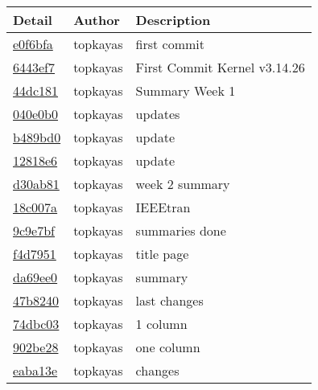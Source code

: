 \begin{tabular}{l l l}\textbf{Detail} & \textbf{Author} & \textbf{Description}\\\hline
\href{git@github.com:topkayas/CS444/commit/e0f6bfaafb812f0756fcb6deb6758c3fe1bf53b0}{e0f6bfa} & topkayas & first commit\\\hline
\href{git@github.com:topkayas/CS444/commit/6443ef797e6589433f3e981c7adaa47f24fd53ba}{6443ef7} & topkayas & First Commit Kernel v3.14.26\\\hline
\href{git@github.com:topkayas/CS444/commit/44dc181c2681efe404325a17c74427d494993060}{44dc181} & topkayas & Summary Week 1\\\hline
\href{git@github.com:topkayas/CS444/commit/040e0b0809d4b0b58787aafb1f8cf2cd4fe2962b}{040e0b0} & topkayas & updates\\\hline
\href{git@github.com:topkayas/CS444/commit/b489bd05b7672cd26e9542f995aac2a7e6d11635}{b489bd0} & topkayas & update\\\hline
\href{git@github.com:topkayas/CS444/commit/12818e6c4169cd06beaf130670f79b7111f5de41}{12818e6} & topkayas & update\\\hline
\href{git@github.com:topkayas/CS444/commit/d30ab815100d1cdb8c11f731b60f8d8bc801a310}{d30ab81} & topkayas & week 2 summary\\\hline
\href{git@github.com:topkayas/CS444/commit/18c007a6079a2a1c950f3b8abd160d71373ecc84}{18c007a} & topkayas & IEEEtran\\\hline
\href{git@github.com:topkayas/CS444/commit/9c9e7bf414a403688cf51d2e12bfb4cd81a9865c}{9c9e7bf} & topkayas & summaries done\\\hline
\href{git@github.com:topkayas/CS444/commit/f4d795117875c265bab1dbd47ea4acda59f437f1}{f4d7951} & topkayas & title page\\\hline
\href{git@github.com:topkayas/CS444/commit/da69ee05be6968f69c8222b99384447b3d0ecc21}{da69ee0} & topkayas & summary\\\hline
\href{git@github.com:topkayas/CS444/commit/47b8240462ba004452a13729ffadf92ccaa6f105}{47b8240} & topkayas & last changes\\\hline
\href{git@github.com:topkayas/CS444/commit/74dbc03c78cb2e617df6e9048f06bd10cb2c8e9b}{74dbc03} & topkayas & 1 column\\\hline
\href{git@github.com:topkayas/CS444/commit/902be284317fd5be08fec57a7fd557e6b3356dde}{902be28} & topkayas & one column\\\hline
\href{git@github.com:topkayas/CS444/commit/eaba13e546007ced6fde62d4111d2ba338b9287d}{eaba13e} & topkayas & changes\\\hline

\end{tabular}
